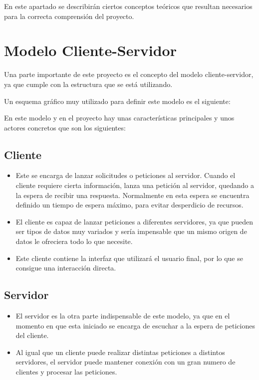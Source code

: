 
En este apartado se describirán ciertos conceptos teóricos que resultan necesarios para la correcta comprensión del proyecto.

\section{Modelo Cliente-Servidor}

Una parte importante de este proyecto es el concepto del modelo cliente-servidor, ya que cumple con la estructura que se está utilizando. \cite{cs1} \cite{cs2}

Un esquema gráfico muy utilizado para definir este modelo es el siguiente:


En este modelo y en el proyecto hay unas características principales y unos actores concretos que son los siguientes:

\subsection{Cliente}
\begin{itemize}
\item Este se encarga de lanzar solicitudes o peticiones al servidor. Cuando el cliente requiere cierta información, lanza una petición al servidor, quedando a la espera de recibir una respuesta. Normalmente en esta espera se encuentra definido un tiempo de espera máximo, para evitar desperdicio de recursos.

\item El cliente es capaz de lanzar peticiones a diferentes servidores, ya que pueden ser tipos de datos muy variados y sería impensable que un mismo origen de datos le ofreciera todo lo que necesite.

\item Este cliente contiene la interfaz que utilizará el usuario final, por lo que se consigue una interacción directa.
\end{itemize}

\subsection{Servidor}
\begin{itemize}
\item El servidor es la otra parte indispensable de este modelo, ya que en el momento en que esta iniciado se encarga de escuchar a la espera de peticiones del cliente.

\item Al igual que un cliente puede realizar distintas peticiones a distintos servidores, el servidor puede mantener conexión con un gran numero de clientes y procesar las peticiones. 

\end{itemize}

